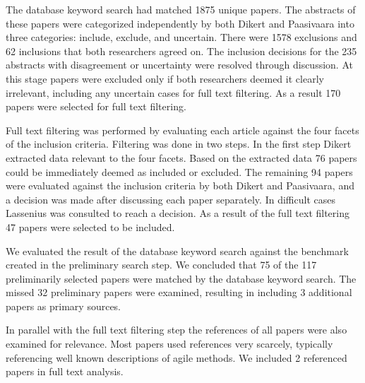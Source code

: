 The database keyword search had matched 1875 unique papers. The abstracts of
these papers were categorized independently by both Dikert and Paasivaara into
three categories: include, exclude, and uncertain. There were 1578 exclusions
and 62 inclusions that both researchers agreed on. The inclusion decisions
for the 235 abstracts with disagreement or uncertainty were resolved through
discussion. At this stage papers were excluded only if both researchers deemed
it clearly irrelevant, including any uncertain cases for full text filtering. As
a result 170 papers were selected for full text filtering.

%
%
%
%
%
%

Full text filtering was performed by evaluating each article against the four
facets of the inclusion criteria. Filtering was done in two steps. In the first
step Dikert extracted data relevant to the four facets. Based on the extracted
data 76 papers could be immediately deemed as included or excluded. The
remaining 94 papers were evaluated against the inclusion criteria by both Dikert
and Paasivaara, and a decision was made after discussing each paper separately.
In difficult cases Lassenius was consulted to reach a decision. As a result of
the full text filtering 47 papers were selected to be included.

We evaluated the result of the database keyword search against the benchmark
created in the preliminary search step. We concluded that 75 of the 117
preliminarily selected papers were matched by the database keyword search.
The missed 32 preliminary papers were examined, resulting in including 3
additional papers as primary sources.

In parallel with the full text filtering step the references of all papers were
also examined for relevance. Most papers used references very scarcely, typically
referencing well known descriptions of agile methods. We included 2 referenced
papers in full text analysis.

